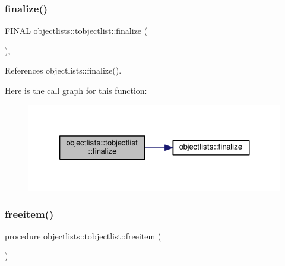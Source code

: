 \subsubsection{\texorpdfstring{finalize()}{finalize()}}
{\footnotesize\ttfamily F\+I\+N\+AL objectlists\+::tobjectlist\+::finalize (\begin{DoxyParamCaption}{ }\end{DoxyParamCaption})\hspace{0.3cm}{\ttfamily [final]}, {\ttfamily [private]}}



References objectlists\+::finalize().

Here is the call graph for this function\+:
\nopagebreak
\begin{figure}[H]
\begin{center}
\leavevmode
\includegraphics[width=324pt]{structobjectlists_1_1tobjectlist_ae3080a1555340ddb78729a367fb158f5_cgraph}
\end{center}
\end{figure}
\mbox{\label{structobjectlists_1_1tobjectlist_aa859443f76f02a2e730a4487a59676b6}} 
\subsubsection{\texorpdfstring{freeitem()}{freeitem()}}
{\footnotesize\ttfamily procedure objectlists\+::tobjectlist\+::freeitem (\begin{DoxyParamCaption}{ }\end{DoxyParamCaption})\hspace{0.3cm}{\ttfamily [private]}}

\mbox{\label{structobjectlists_1_1tobjectlist_afd3d2cc200f7f707b0e3c8d6dd1d8c22}} 
